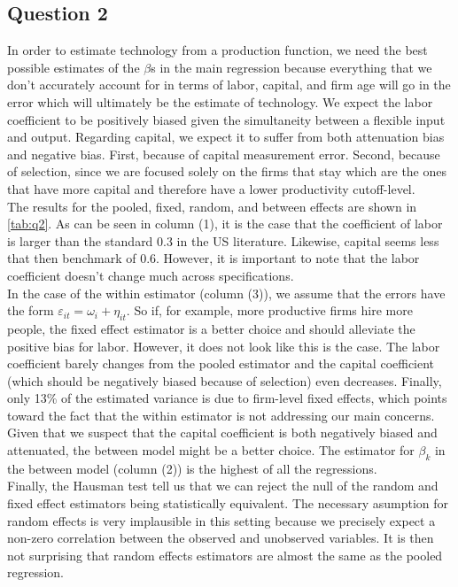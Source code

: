 \documentclass[11pt]{article}
\begin{document}
\subsection*{Question 2}
In order to estimate technology from a production function, we need the best possible estimates of the $\beta$s in the main regression because everything that we don't accurately account for in terms of labor, capital, and firm age will go in the error which will ultimately be the estimate of technology. We expect the labor coefficient to be positively biased given the simultaneity between a flexible input and output. Regarding capital, we expect it to suffer from both attenuation bias and negative bias. First, because of capital measurement error. Second, because of selection, since we are focused solely on the firms that stay which are the ones that have more capital and therefore have a lower productivity cutoff-level.\\

The results for the pooled, fixed, random, and between effects are shown in \autoref{tab:q2}. As can be seen in column (1), it is the case that the coefficient of labor is larger than the standard 0.3 in the US literature. Likewise, capital seems less that then benchmark of 0.6. However, it is important to note that the labor coefficient doesn't change much across specifications. \\

In the case of the within estimator (column (3)), we assume that the errors have the form $\varepsilon_{it}=\omega_i+\eta_{it}$. So if, for example, more productive firms hire more people, the fixed effect estimator is a better choice and should alleviate the positive bias for labor. However, it does not look like this is the case. The labor coefficient barely changes from the pooled estimator and the capital coefficient (which should be negatively biased because of selection) even decreases. Finally, only 13\% of the estimated variance is due to firm-level fixed effects, which points toward the fact that the within estimator is not addressing our main concerns. \\

Given that we suspect that the capital coefficient is both negatively biased and attenuated, the between model might be a better choice. The estimator for $\beta_k$ in the between model (column (2)) is the highest of all the regressions. \\

Finally, the Hausman test tell us that we can reject the null of the random and fixed effect estimators being statistically equivalent. The necessary asumption for random effects is very implausible in this setting because we precisely expect a non-zero correlation between the observed and unobserved variables. It is then not surprising that random effects estimators are almost the same as the pooled regression.
\end{document}
